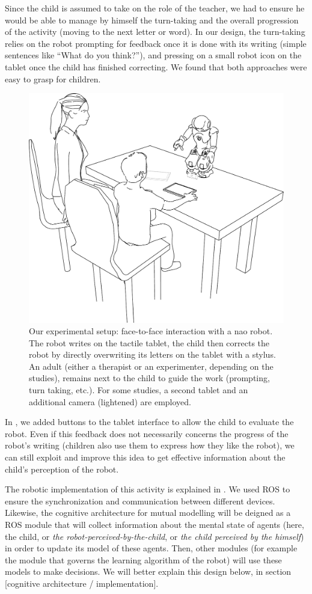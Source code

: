 \documentclass[10pt,a4paper,twocolumn]{article}
\begin{document}
Since the child is assumed to take on the role of the teacher, we had to ensure
he would be able to manage by himself the turn-taking and the overall
progression of the activity (moving to the next letter or word). In our design,
the turn-taking relies on the robot prompting for feedback once it is done with
its writing (simple sentences like ``What do you think?''), and pressing on a
small robot icon on the tablet once the child has finished correcting. We found that both approaches were easy to grasp for children.


   \begin{figure}
       \centering
       \includegraphics[width=0.6\columnwidth]{experimental_setup}
       \caption{\small Our experimental setup: face-to-face interaction with a {\sc
           nao} robot.  The robot writes on the tactile tablet, the child then
           corrects the robot by directly overwriting its letters on the tablet
           with a stylus. An adult (either a therapist or an experimenter,
           depending on the studies), remains next to the child to guide the work
           (prompting, turn taking, etc.). For some studies, a second tablet and an
           additional camera (lightened) are employed.}

       \label{experimental_setup}
   \end{figure}
   
In \cite{jacq2016building}, we added buttons to the tablet interface to allow the child to evaluate the robot. Even if this feedback does not necessarily concerns the progress of the robot's writing (children also use them to express how they like the robot), we can still exploit and improve this idea to get effective information about the child's perception of the robot.
   
The robotic implementation of this activity is explained in \cite{Hood}. We used ROS to ensure the synchronization and communication between different devices. Likewise, the cognitive architecture for mutual modelling will be deigned as a ROS module that will collect information about the mental state of agents (here, the child, or \textit{the robot-perceived-by-the-child}, or \textit{the child perceived by the himself}) in order to update its model of these agents. Then, other modules (for example the module that governs the learning algorithm of the robot) will use these models to make decisions. We will better explain this design below, in section [cognitive architecture / implementation].
\end{document}
